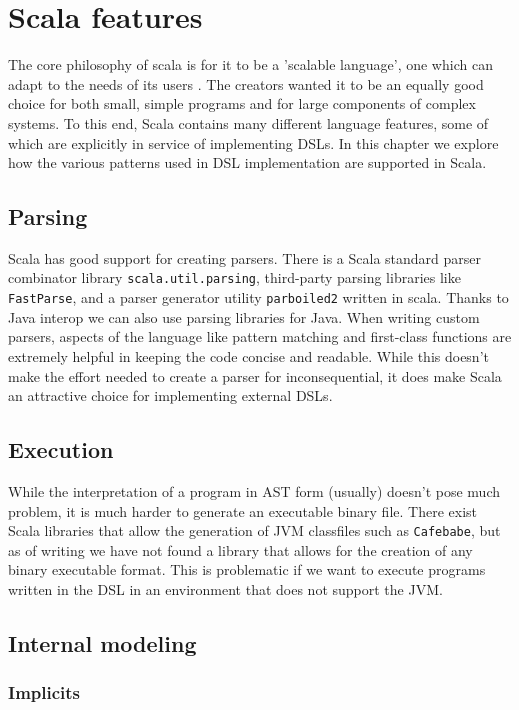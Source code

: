 \chapter{Scala features}
The core philosophy of scala is for it to be a 'scalable language', one which can adapt to the needs of its users \autocite{Odersky:2004}.
The creators wanted it to be an equally good choice for both small, simple programs and for large components of complex systems.
To this end, Scala contains many different language features, some of which are explicitly in service of implementing DSLs.
In this chapter we explore how the various patterns used in DSL implementation are supported in Scala.

\section{Parsing}

Scala has good support for creating parsers.
There is a Scala standard parser combinator library \texttt{scala.util.parsing}, third-party parsing libraries like \texttt{FastParse}, and a parser generator utility \texttt{parboiled2} written in scala.
Thanks to Java interop we can also use parsing libraries for Java.
When writing custom parsers, aspects of the language like pattern matching and first-class functions are extremely helpful in keeping the code concise and readable.
While this doesn't make the effort needed to create a parser for inconsequential, it does make Scala an attractive choice for implementing external DSLs.

\section{Execution}

While the interpretation of a program in AST form  (usually) doesn't pose much problem, it is much harder to generate an executable binary file.
There exist Scala libraries that allow the generation of JVM classfiles such as \texttt{Cafebabe}, but as of writing we have not found a library that allows for the creation of any binary executable format.
This is problematic if we want to execute programs written in the DSL in an environment that does not support the JVM.

\section{Internal modeling}

\subsection{Implicits}

